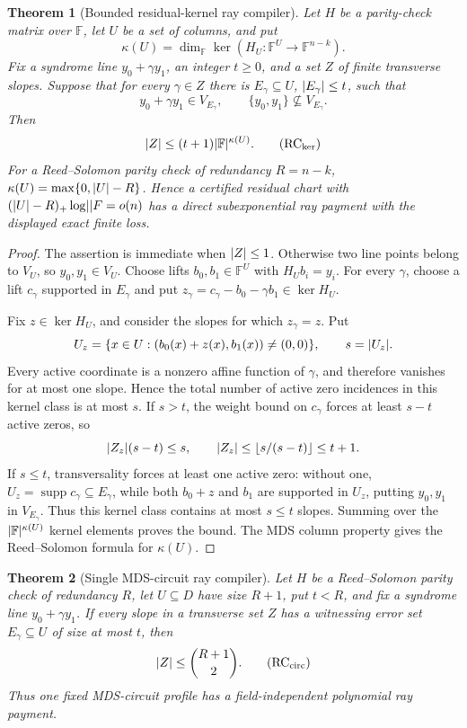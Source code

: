 \documentclass[11pt,a4paper]{amsart}
\numberwithin{equation}{section}
\newtheorem{theorem}{Theorem}[section]
\theoremstyle{remark}
\DeclareMathOperator{\supp}{supp}\DeclareMathOperator{\Fib}{Fib}\DeclareMathOperator{\Sym}{Sym}
\newcommand{\F}{\mathbb F}\newcommand{\B}{\mathbb B}\newcommand{\K}{\mathbb K}\newcommand{\Z}{\mathbb Z}
\begin{document}
\begin{theorem}[Bounded residual-kernel ray compiler]
\label{thm:bounded-residual-kernel-ray}
Let \(H\) be a parity-check matrix over \(\F\), let \(U\) be a set of
columns, and put
\[
 \kappa(U)=\dim_\F\ker(H_U:\F^U\longrightarrow\F^{n-k}).
\]
Fix a syndrome line \(y_0+\gamma y_1\), an integer \(t\ge0\), and a set
\(Z\) of finite transverse slopes.  Suppose that for every \(\gamma\in Z\)
there is \(E_\gamma\subseteq U\), \(\lvert E_\gamma\rvert\le t\), such that
\[
 y_0+\gamma y_1\in V_{E_\gamma},\qquad
 \{y_0,y_1\}\not\subseteq V_{E_\gamma}.
\]
Then
\[
                  \abs Z\le(t+1)\abs{\F}^{\kappa(U)}. \tag{RC$_{\rm ker}$}
\]
For a Reed--Solomon parity check of redundancy \(R=n-k\),
\(\kappa(U)=\max\{0,\lvert U\rvert-R\}\).  Hence a certified residual chart with
\((\abs U-R)_+\log\abs\F=o(n)\) has a direct subexponential ray payment
with the displayed exact finite loss.
\end{theorem}

\begin{proof}
The assertion is immediate when \(\lvert Z\rvert\le1\).  Otherwise two line
points belong to \(V_U\), so \(y_0,y_1\in V_U\).  Choose lifts
\(b_0,b_1\in\F^U\) with \(H_Ub_i=y_i\).  For every \(\gamma\), choose a
lift \(c_\gamma\) supported in \(E_\gamma\) and put
\(z_\gamma=c_\gamma-b_0-\gamma b_1\in\ker H_U\).

Fix \(z\in\ker H_U\), and consider the slopes for which
\(z_\gamma=z\).  Put
\[
 U_z=\{x\in U:(b_0(x)+z(x),b_1(x))\ne(0,0)\},
 \qquad s=\lvert U_z\rvert.
\]
Every active coordinate is a nonzero affine function of \(\gamma\), and
therefore vanishes for at most one slope.  Hence the total number of active
zero incidences in this kernel class is at most \(s\).  If \(s>t\), the
weight bound on \(c_\gamma\) forces at least \(s-t\) active zeros, so
\[
 \lvert Z_z\rvert(s-t)\le s,\qquad
 \lvert Z_z\rvert\le\left\lfloor s/(s-t)\right\rfloor\le t+1.
\]
If \(s\le t\), transversality forces
at least one active zero: without one,
\(U_z=\supp c_\gamma\subseteq E_\gamma\), while both \(b_0+z\) and
\(b_1\) are supported in \(U_z\), putting \(y_0,y_1\) in
\(V_{E_\gamma}\).  Thus this kernel class contains at most \(s\le t\)
slopes.  Summing over the \(\abs{\F}^{\kappa(U)}\) kernel elements proves
the bound.  The MDS column property gives the Reed--Solomon formula for
\(\kappa(U)\).
\end{proof}

\begin{theorem}[Single MDS-circuit ray compiler]
\label{thm:single-mds-circuit-ray}
Let \(H\) be a Reed--Solomon parity check of redundancy \(R\), let
\(U\subseteq D\) have size \(R+1\), put \(t<R\), and fix a syndrome line
\(y_0+\gamma y_1\).  If every slope in a transverse set \(Z\) has a witnessing error set
\(E_\gamma\subseteq U\) of size at most \(t\), then
\[
                         \abs Z\le\binom{R+1}{2}.   \tag{RC$_{\rm circ}$}
\]
Thus one fixed MDS-circuit profile has a field-independent polynomial ray
payment.
\end{theorem}
\end{document}
